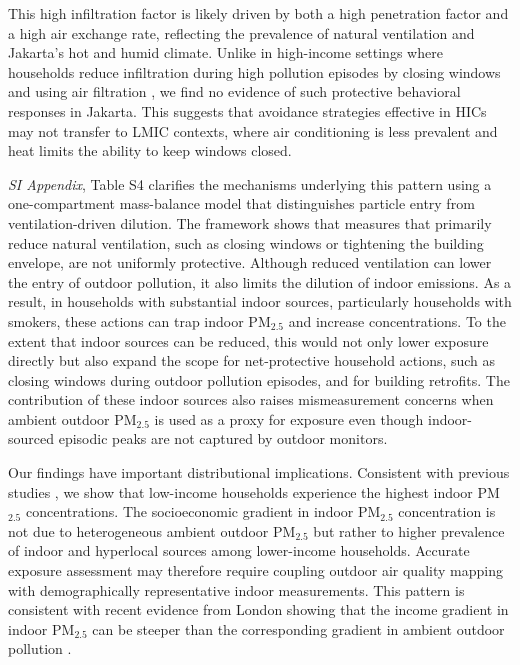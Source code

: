 \documentclass[9pt,twocolumn,twoside]{pnas-new}
\begin{document}
This high infiltration factor is likely driven by both a high penetration factor and a high air exchange rate, reflecting the prevalence of natural ventilation and Jakarta's hot and humid climate. Unlike in high-income settings where households reduce infiltration during high pollution episodes by closing windows and using air filtration \citep{burke_exposures_2022}, we find no evidence of such protective behavioral responses in Jakarta. This suggests that avoidance strategies effective in HICs may not transfer to LMIC contexts, where air conditioning is less prevalent and heat limits the ability to keep windows closed.

\textit{SI Appendix}, Table S4 clarifies the mechanisms underlying this pattern using a one-compartment mass-balance model that distinguishes particle entry from ventilation-driven dilution. The framework shows that measures that primarily reduce natural ventilation, such as closing windows or tightening the building envelope, are not uniformly protective. Although reduced ventilation can lower the entry of outdoor pollution, it also limits the dilution of indoor emissions. As a result, in households with substantial indoor sources, particularly households with smokers, these actions can trap indoor PM$_{2.5}$ and increase concentrations. To the extent that indoor sources can be reduced, this would not only lower exposure directly but also expand the scope for net-protective household actions, such as closing windows during outdoor pollution episodes, and for building retrofits. 
%
The contribution of these indoor sources also raises mismeasurement concerns when ambient outdoor PM$_{2.5}$ is used as a proxy for exposure even though indoor-sourced episodic peaks are not captured by outdoor monitors.

Our findings have important distributional implications. Consistent with previous studies \citep{greenstone_indoor_2021, burke_exposures_2022, ito_willingness_2020}, we show that low-income households experience the highest indoor PM$_{2.5}$ concentrations. 
The socioeconomic gradient in indoor PM$_{2.5}$ concentration is not due to heterogeneous ambient outdoor PM$_{2.5}$ but rather to higher prevalence of indoor and hyperlocal sources among lower-income households. Accurate exposure assessment may therefore require coupling outdoor air quality mapping with demographically representative indoor measurements. This pattern is consistent with recent evidence from London showing that the income gradient in indoor PM$_{2.5}$ can be steeper than the corresponding gradient in ambient outdoor pollution \citep{metcalfe_making_2025}.
\end{document}
